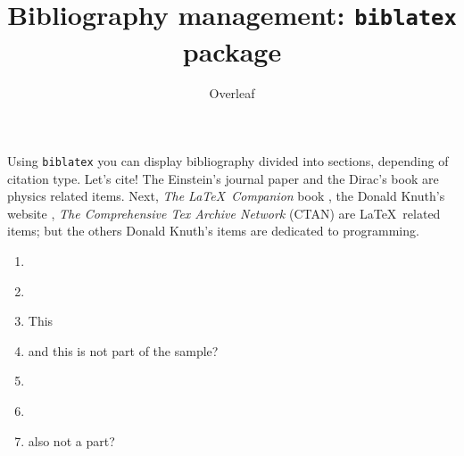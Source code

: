 \documentclass{article}
\title{Bibliography management: \texttt{biblatex} package}
\author{Overleaf}
\date{ }
\begin{document}
\maketitle

Using \texttt{biblatex} you can display bibliography divided into sections,
depending of citation type.
Let's cite! The Einstein's journal paper \cite{einstein} and the Dirac's
book \cite{dirac} are physics related items.
Next, \textit{The \LaTeX\ Companion} book \cite{latexcompanion}, the Donald
Knuth's website \cite{knuthwebsite}, \textit{The Comprehensive Tex Archive
Network} (CTAN) \cite{ctan} are \LaTeX\ related items; but the others Donald
Knuth's items \cite{knuth-fa,knuth-acp} are dedicated to programming.


\begin{enumerate}
    \item \cite{einstein}
    \item \cite{dirac}
    \item \cite{latexcompanion} This
    \item \cite{ctan} and this is not part of the sample?
    \item \cite{knuth-fa,knuth-acp}
    \item \cite{knuth-fa}
    \item \cite{knuth-acp} also not a part?
\end{enumerate}

\medskip

\printbibliography
\end{document}
